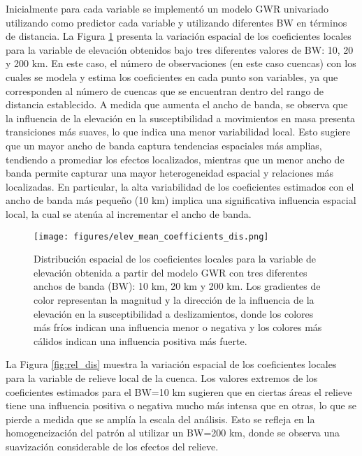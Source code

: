 \documentclass[
  manuscript=article,  
  layout=preprint,  
]{format}
\begin{document}
Inicialmente para cada variable se implementó un modelo GWR univariado utilizando como predictor cada variable y utilizando diferentes BW en términos de distancia. La Figura \ref{fig:elev_dis} presenta la variación espacial de los coeficientes locales para la variable de elevación obtenidos bajo tres diferentes valores de BW: 10, 20 y 200 km. En este caso, el número de observaciones (en este caso cuencas) con los cuales se modela y estima los coeficientes en cada punto son variables, ya que corresponden al número de cuencas que se encuentran dentro del rango de distancia establecido. A medida que aumenta el ancho de banda, se observa que la influencia de la elevación en la susceptibilidad a movimientos en masa presenta transiciones más suaves, lo que indica una menor variabilidad local. Esto sugiere que un mayor ancho de banda captura tendencias espaciales más amplias, tendiendo a promediar los efectos localizados, mientras que un menor ancho de banda permite capturar una mayor heterogeneidad espacial y relaciones más localizadas. En particular, la alta variabilidad de los coeficientes estimados con el ancho de banda más pequeño (10 km) implica una significativa influencia espacial local, la cual se atenúa al incrementar el ancho de banda.

\begin{figure}[ht!]
    \centering
      {\texttt{[image: figures/elev\_mean\_coefficients\_dis.png]}}
\caption{Distribución espacial de los coeficientes locales para la variable de elevación obtenida a partir del modelo GWR con tres diferentes anchos de banda (BW): 10 km, 20 km y 200 km. Los gradientes de color representan la magnitud y la dirección de la influencia de la elevación en la susceptibilidad a deslizamientos, donde los colores más fríos indican una influencia menor o negativa y los colores más cálidos indican una influencia positiva más fuerte.}
    \label{fig:elev_dis}
\end{figure}

La Figura \ref{fig:rel_dis} muestra la variación espacial de los coeficientes locales para la variable de relieve local de la cuenca. Los valores extremos de los coeficientes estimados para el BW=10 km sugieren que en ciertas áreas el relieve tiene una influencia positiva o negativa mucho más intensa que en otras, lo que se pierde a medida que se amplía la escala del análisis. Esto se refleja en la homogeneización del patrón al utilizar un BW=200 km, donde se observa una suavización considerable de los efectos del relieve.
\end{document}
